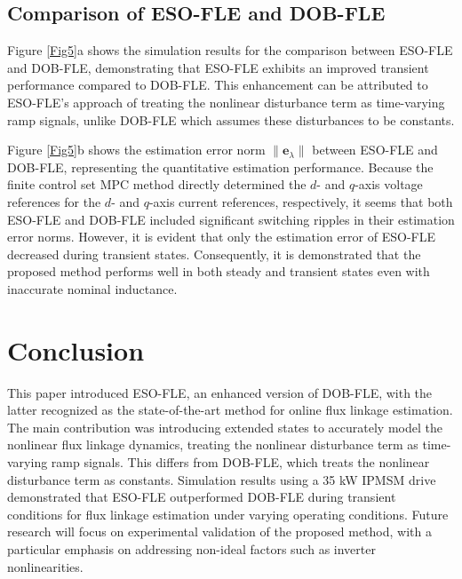 \documentclass[conference]{IEEEtran}
\begin{document}
\subsection{Comparison of ESO-FLE and DOB-FLE}\label{sec_b}
    
Figure \ref{Fig5}a shows the simulation results for the comparison between ESO-FLE and DOB-FLE, demonstrating that ESO-FLE exhibits an improved transient performance compared to DOB-FLE. This enhancement can be attributed to ESO-FLE's approach of treating the nonlinear disturbance term as time-varying ramp signals, unlike DOB-FLE which assumes these disturbances to be constants. 

Figure \ref{Fig5}b shows the estimation error norm $ \| \boldsymbol{e}_{\lambda} \|$ between ESO-FLE and DOB-FLE, representing the quantitative estimation performance. Because the finite control set MPC method directly determined the $d$- and $q$-axis voltage references for the $d$- and $q$-axis current references, respectively, it seems that both ESO-FLE and DOB-FLE included significant switching ripples in their estimation error norms. However, it is evident that only the estimation error of ESO-FLE decreased during transient states. Consequently, it is demonstrated that the proposed method performs well in both steady and transient states even with inaccurate nominal inductance.

\section{Conclusion}

This paper introduced ESO-FLE, an enhanced version of DOB-FLE, with the latter recognized as the state-of-the-art method for online flux linkage estimation. The main contribution was introducing extended states to accurately model the nonlinear flux linkage dynamics, treating the nonlinear disturbance term as time-varying ramp signals. This differs from DOB-FLE,  which treats the nonlinear disturbance term as constants. Simulation results using a 35 kW IPMSM drive demonstrated that ESO-FLE outperformed DOB-FLE during transient conditions for flux linkage estimation under varying operating conditions. Future research will focus on experimental validation of the proposed method, with a particular emphasis on addressing non-ideal factors such as inverter nonlinearities.
\end{document}
